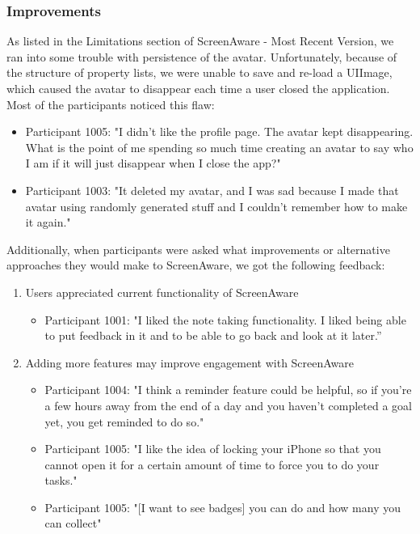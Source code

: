 \documentclass[12pt, title page, manuscript, nonacm]{acmart}
\begin{document}
\subsubsection*{Improvements}
As listed in the Limitations section of ScreenAware - Most Recent Version, we ran into some trouble with persistence of the avatar. Unfortunately, because of the structure of property lists, we were unable to save and re-load a UIImage, which caused the avatar to disappear each time a user closed the application. Most of the participants noticed this flaw: 
\begin{itemize}
    \item Participant 1005: "I didn't like the profile page. The avatar kept disappearing. What is the point of me spending so much time creating an avatar to say who I am if it will just disappear when I close the app?"
    \item Participant 1003: "It deleted my avatar, and I was sad because I made that avatar using randomly generated stuff and I couldn't remember how to make it again."
\end{itemize}
Additionally, when participants were asked what improvements or alternative approaches they would make to ScreenAware, we got the following feedback:
\begin{enumerate}
    \item Users appreciated current functionality of ScreenAware
    \begin{itemize}
        \item Participant 1001: "I liked the note taking functionality. I liked being able to put feedback in it and to be able to go back and look at it later.”
    \end{itemize}
    \item Adding more features may improve engagement with ScreenAware
    \begin{itemize}
        \item Participant 1004: "I think a reminder feature could be helpful, so if you're a few hours away from the end of a day and you haven't completed a goal yet, you get reminded to do so."
        \item Participant 1005: "I like the idea of locking your iPhone so that you cannot open it for a certain amount of time to force you to do your tasks."
        \item Participant 1005: "[I want to see badges] you can do and how many you can collect"
    \end{itemize}
\end{enumerate}
\end{document}
